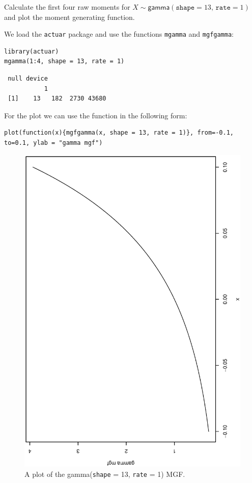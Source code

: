 \documentclass[captions=tableheading]{scrbook}
\begin{document}
\begin{example}
Calculate the first four raw moments for \(X\sim\mathsf{gamma}(\mathtt{shape}=13,\,\mathtt{rate}=1)\) and plot the moment generating function.

We load the \texttt{actuar} package and use the functions \texttt{mgamma} and \texttt{mgfgamma}:

\begin{verbatim}
library(actuar)
mgamma(1:4, shape = 13, rate = 1)
\end{verbatim}

\begin{verbatim}
 null device 
           1
 [1]    13   182  2730 43680
\end{verbatim}

For the plot we can use the function in the following form:


\begin{verbatim}
plot(function(x){mgfgamma(x, shape = 13, rate = 1)}, from=-0.1, to=0.1, ylab = "gamma mgf")
\end{verbatim}



\begin{figure}[th]
    \includegraphics[angle=270, totalheight=4in]{img/gamma-mgf.ps}
    \caption[Plot of the \textsf{gamma}(\texttt{shape} = 13, \texttt{rate} = 1) MGF]{\small A plot of the \textsf{gamma}(\texttt{shape} = 13, \texttt{rate} = 1) MGF.}
    \label{fig:gamma-mgf}
  \end{figure}


\end{example}
\end{document}
